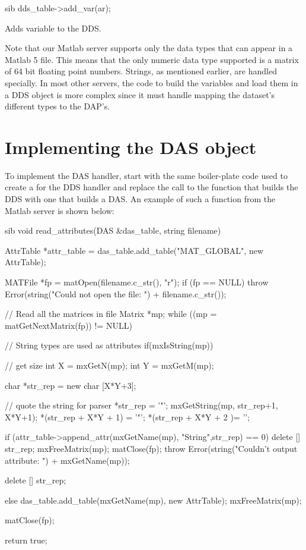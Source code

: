 \documentclass{dods-paper}
\begin{document}
\begin{vcode}{sib}
    dds_table->add_var(ar);
\end{vcode}

Adds variable  to the DDS.

Note that our Matlab server supports only the data types that can appear
in a Matlab 5 file. This means that the only numeric data type supported
is a matrix of 64 bit floating point numbers. Strings, as mentioned earlier,
are handled specially. In most other servers, the code to build the variables
and load them in a DDS object is more complex since it must handle mapping
the dataset's different types to the DAP's.

\section{Implementing the DAS object}

To implement the DAS handler, start with the same boiler-plate code
used to create a  for the DDS handler and replace the call
to the function that builds the DDS with one that builds a DAS. An
example of such a function from the Matlab server is shown below:

\begin{vcode}{sib}
void
read_attributes(DAS &das_table, string filename)
{
    AttrTable *attr_table = das_table.add_table("MAT_GLOBAL", new AttrTable);
    
    MATFile *fp = matOpen(filename.c_str(), "r");
    if (fp == NULL)
        throw Error(string("Could not open the file: ") + filename.c_str());

    // Read all the matrices in file
    Matrix *mp;
    while ((mp = matGetNextMatrix(fp)) != NULL) {
        // String types are used as attributes
        if(mxIsString(mp)) {
            // get size
            int X = mxGetN(mp);
            int Y = mxGetM(mp);

            char *str_rep = new char [X*Y+3];
      
            // quote the string for parser
            *str_rep = '"'; 
            mxGetString(mp, str_rep+1, X*Y+1);
            *(str_rep + X*Y + 1) = '"';
            *(str_rep + X*Y + 2 )= '\0';

            if (attr_table->append_attr(mxGetName(mp),
                "String",str_rep) == 0) {
                delete [] str_rep;
                mxFreeMatrix(mp);
                matClose(fp);
                throw Error(string("Couldn't output attribute: ")
                            + mxGetName(mp));
            }

            delete [] str_rep;
        }
        else {
            das_table.add_table(mxGetName(mp), new AttrTable);
        }
        mxFreeMatrix(mp);
    }
    matClose(fp);

    return true;
}
\end{vcode}
  
\end{document}
